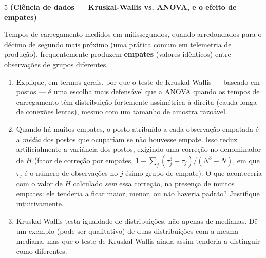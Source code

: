 \documentclass[11pt]{article}
\begin{document}
\begin{questao}{5} \textbf{(Ciência de dados --- Kruskal-Wallis vs. ANOVA, e o efeito de empates)}

Tempos de carregamento medidos em milissegundos, quando arredondados para o décimo de segundo
mais próximo (uma prática comum em telemetria de produção), frequentemente produzem
\textbf{empates} (valores idênticos) entre observações de grupos diferentes.

\begin{enumerate}[label=(\alph*)]
  \item Explique, em termos gerais, por que o teste de Kruskal-Wallis --- baseado em postos ---
    é uma escolha mais defensável que a ANOVA quando os tempos de carregamento têm distribuição
    fortemente assimétrica à direita (cauda longa de conexões lentas), mesmo com um tamanho de
    amostra razoável.
  \item Quando há muitos empates, o posto atribuído a cada observação empatada é a \emph{média}
    dos postos que ocupariam se não houvesse empate. Isso reduz artificialmente a variância dos
    postos, exigindo uma correção no denominador de $H$ (fator de correção por empates,
    $1 - \sum_j (\tau_j^3-\tau_j)/(N^3-N)$, em que $\tau_j$ é o número de observações no
    $j$-ésimo grupo de empate). O que aconteceria com o valor de $H$ calculado \emph{sem} essa
    correção, na presença de muitos empates: ele tenderia a ficar maior, menor, ou não haveria
    padrão? Justifique intuitivamente.
  \item Kruskal-Wallis testa igualdade de distribuições, não apenas de medianas. Dê um exemplo
    (pode ser qualitativo) de duas distribuições com a mesma mediana, mas que o teste de
    Kruskal-Wallis ainda assim tenderia a distinguir como diferentes.
\end{enumerate}
\end{questao}
\end{document}
